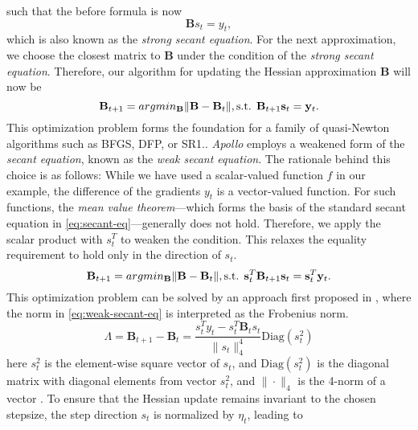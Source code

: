 such that the before formula is now
\label{eq:secant-eq}
\begin{equation}
    \mathbf{B}s_t = y_t,
\end{equation}
which is also known as the \emph{strong secant equation}. For the next approximation, we choose the
closest matrix to $\mathbf{B}$ under the condition of the \emph{strong secant equation}.
Therefore, our algorithm for updating
the Hessian approximation $\mathbf{B}$ will now be 
\begin{equation}
    \mathbf{B}_{t+1} = argmin_{\mathbf{B}} \|\mathbf{B} - \mathbf{B}_t\|,\\
    \text{s.t. }  \mathbf{B}_{t+1}\mathbf{s}_t = \mathbf{y}_t.
\end{equation}
This optimization problem forms the foundation for a family of quasi-Newton algorithms
such as BFGS\cite{BFGS}, DFP\cite{DFP}, or SR1\cite{SR1}.\cite{apollo}.
\emph{Apollo} employs a weakened form of the \emph{secant equation}, known as the \emph{weak secant equation}. The rationale behind this choice is as follows:
While we have used a scalar-valued function $f$ in our example, the difference of the gradients $y_t$
is a vector-valued function. For such functions, the \emph{mean value theorem}—which forms the basis of the standard secant equation in \ref{eq:secant-eq}—generally does not hold\cite{apollo}. 
Therefore, we apply the scalar product with $s_t^T$ to weaken the condition. This relaxes the equality requirement to hold only in the direction of $s_t$.
\begin{equation}
    \label{eq:weak-secant-eq}
    \mathbf{B}_{t+1} = argmin_{\mathbf{B}} \|\mathbf{B} - \mathbf{B}_t\|, \\
    \text{s.t. } \mathbf{s}^T_t \mathbf{B}_{t+1}\mathbf{s}_t =\mathbf{s}^T_t \mathbf{y}_t.
\end{equation}
This optimization problem can be solved by an approach first proposed in \cite{Zhu1999TheQR},
where the norm in \ref{eq:weak-secant-eq} is interpreted as the Frobenius norm.
\begin{equation}
    \Lambda= \mathbf{B}_{t+1} - \mathbf{B}_t = \frac{s_t^T y_t - s_t^T \mathbf{B}_t s_t}{\|s_t\|_4^4} \text{Diag}(s_t^2)
\end{equation}
here $s_t^2$ is the element-wise square vector of $s_t$, and $\text{Diag}(s_t^2)$ is the diagonal matrix with diagonal elements from vector $s_t^2$, and $\|\cdot\|_4$ is the 4-norm of a vector \cite{apollo}.
To ensure that the Hessian update remains invariant to the chosen stepsize, the step direction \( s_t \) is normalized by \( \eta_t \), leading to
